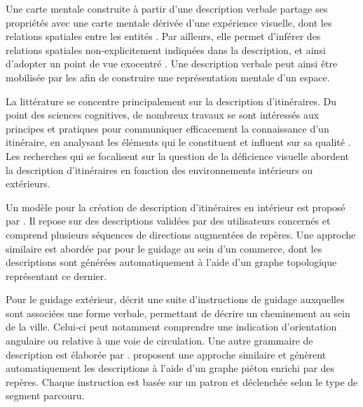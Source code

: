 

Une carte mentale construite à partir d'une description verbale partage ses propriétés avec une carte mentale dérivée d'une expérience visuelle, dont les relations spatiales entre les entités \cite{Denis1992}. Par ailleurs, elle permet d'inférer des relations spatiales non-explicitement indiquées dans la description, et ainsi d'adopter un point de vue exocentré \cite{Avraamides2004}. Une description verbale peut ainsi être mobilisée par les \pcdvs{} afin de construire une représentation mentale d'un espace.

\newpar{}


La littérature se concentre principalement sur la description d'itinéraires. Du point des sciences cognitives, de nombreux travaux se sont intéressés aux principes et pratiques pour communiquer efficacement la connaissance d’un itinéraire, en analysant les éléments qui le constituent et influent sur sa qualité \cite{Allen2000,Lovelace1999}. Les recherches qui se focalisent sur la question de la déficience visuelle abordent la description d'itinéraires en fonction des environnements intérieurs ou extérieurs.

Un modèle pour la création de description d'itinéraires en intérieur est proposé par \cite{Troeger2020}. Il repose sur des descriptions validées par des utilisateurs concernés et comprend plusieurs séquences de directions augmentées de repères. Une approche similaire est abordée par \cite{Kulyukin2008} pour le guidage au sein d'un commerce, dont les descriptions sont générées automatiquement à l'aide d'un graphe topologique représentant ce dernier.

Pour le guidage extérieur, \cite{gaunet_verbal_2006} décrit une suite d’instructions de guidage auxquelles sont associées une forme verbale, permettant de décrire un cheminement au sein de la ville. Celui-ci peut notamment comprendre une indication d’orientation angulaire ou relative à une voie de circulation. Une autre grammaire de description est élaborée par \cite{Constantinescu2019}. \cite{Balata2016} proposent une approche similaire et génèrent automatiquement les descriptions à l'aide d'un graphe piéton enrichi par des repères. Chaque instruction est basée sur un patron et déclenchée selon le type de segment parcouru.


